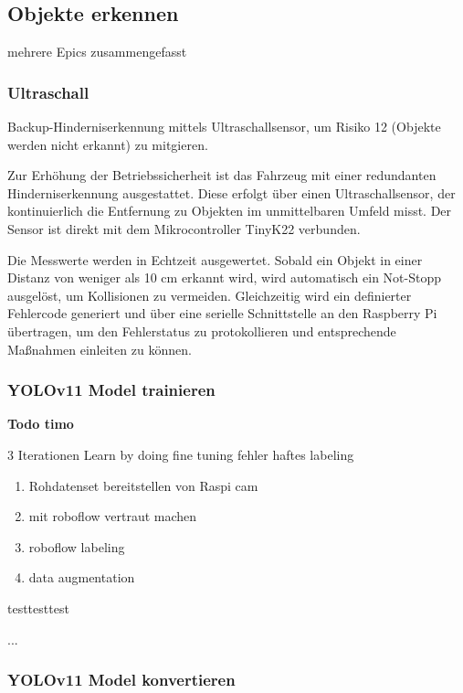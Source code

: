 
\subsection{Objekte erkennen}

mehrere Epics zusammengefasst 

\subsubsection{Ultraschall}
\label{ultraschall}

Backup-Hinderniserkennung mittels Ultraschallsensor, um Risiko 12 (Objekte werden nicht erkannt) zu mitgieren.

Zur Erhöhung der Betriebssicherheit ist das Fahrzeug mit einer redundanten Hinderniserkennung ausgestattet. Diese erfolgt über einen Ultraschallsensor, der kontinuierlich die Entfernung zu Objekten im unmittelbaren Umfeld misst. Der Sensor ist direkt mit dem Mikrocontroller TinyK22 verbunden.

Die Messwerte werden in Echtzeit ausgewertet. Sobald ein Objekt in einer Distanz von weniger als 10 cm erkannt wird, wird automatisch ein Not-Stopp ausgelöst, um Kollisionen zu vermeiden. Gleichzeitig wird ein definierter Fehlercode generiert und über eine serielle Schnittstelle an den Raspberry Pi übertragen, um den Fehlerstatus zu protokollieren und entsprechende Maßnahmen einleiten zu können.


\subsubsection{YOLOv11 Model trainieren}
\textbf{Todo timo}

3 Iterationen
Learn by doing
fine tuning
fehler haftes labeling
\begin{enumerate}
    \item Rohdatenset bereitstellen von Raspi cam
    \item mit roboflow vertraut machen
    \item roboflow labeling
    \item data augmentation
\end{enumerate}
testtesttest

...
\subsubsection{YOLOv11 Model konvertieren}
\label{convert-yolo}

